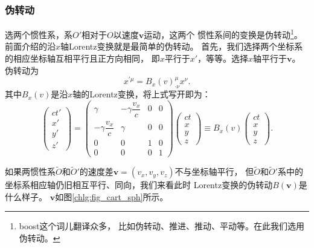 \subsubsection{伪转动}
选两个惯性系，系$O'$相对于$O$以速度$\boldsymbol{v}$运动，这两个
惯性系间的变换是伪转动{\footnote{boost这个词儿翻译众多，
        比如伪转动、推进、推动、平动等。在此我们选用伪转动。}}。
前面介绍的沿$x$轴Lorentz变换就是最简单的伪转动。
首先，我们选择两个坐标系的相应坐标轴互相平行且正方向相同，
即$x$平行于$x'$，等等。选择$x$轴平行于$\boldsymbol{v}$。
伪转动为
\begin{equation}\label{chlg:eqn_lorentz-matrix-b}
    x^{\prime \mu} = B_x({v}) ^\mu _{\cdot \nu} x^\nu .
\end{equation}
其中$B_x({v})$是沿$x$轴的Lorentz变换，将上式写开即为：
\begin{equation}\label{chlg:eqn_lorentz-transofrm-x-MatrixForm}
	\begin{pmatrix}
		ct'\\x'\\y'\\z'
	\end{pmatrix} =
	\begin{pmatrix}
		\gamma & -\gamma \dfrac{v_x}{c}  & 0 & 0 \\
		-\gamma \dfrac{v_x}{c} & \gamma  & 0 & 0 \\
		0 & 0 & 1 & 0 \\
		0 & 0 & 0 & 1
	\end{pmatrix}
	\begin{pmatrix}
		ct\\x\\y\\z
	\end{pmatrix} \equiv B_x({v})
	\begin{pmatrix}
		ct\\x\\y\\z
	\end{pmatrix}.
\end{equation}





如果两惯性系$\tilde{O}$和$\tilde{O}'$的速度差$\boldsymbol{v}=(v_x,v_y,v_z)$不与坐标轴平行，
但$\tilde{O}$和$\tilde{O}'$系中的坐标系相应轴仍旧相互平行、同向，我们来看此时
Lorentz变换的伪转动$B(\boldsymbol{v})$是什么样子。
$\boldsymbol{v}$如图\ref{chlg:fig_cart_sph}所示。

